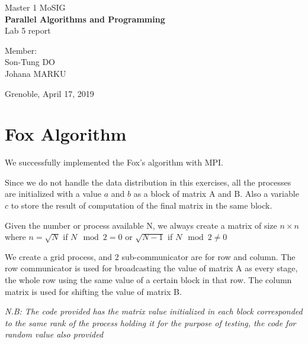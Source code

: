 \documentclass{article}
\begin{document}
\begin{titlepage}
\begin{center}


{\large Master 1 MoSIG}\\[0.5cm]
\vspace*{10cm}
{\Huge \textbf{Parallel Algorithms and Programming} }\\[0.5cm]
{\large Lab 5 report} \\[3cm]

\noindent
\begin{minipage}{0.4\textwidth}

   \centering Member:\\Son-Tung \uppercase{Do}\\Johana \uppercase{Marku}

\end{minipage}%

\vfill
{Grenoble, April 17, 2019}
\clearpage


\end{center}
\end{titlepage}

\section{Fox Algorithm}
We successfully implemented the Fox's algorithm with MPI.
\bigskip

Since we do not handle the data distribution in this exercises, all the processes are initialized with a value $a$ and $b$ as a block of matrix A and B. Also a variable $c$ to store the result of computation of the final matrix in the same block.

Given the number or process available N, we always create a matrix of size $n \times n$ where $n \equal \sqrt{N}$ if $N \mod 2 \equal 0$ or $ \sqrt{N-1}$ if $N \mod 2 \neq 0 $

We create a grid process, and 2 sub-communicator are for row and column. The row communicator is used for broadcasting the value of matrix A as every stage, the whole row using the same value of a certain block in that row. The column matrix is used for shifting the value of matrix B.

\bigskip
\textit{N.B: The code provided has the matrix value initialized in each block corresponded to the same rank of the process holding it for the purpose of testing, the code for random value also provided}
\end{document}
